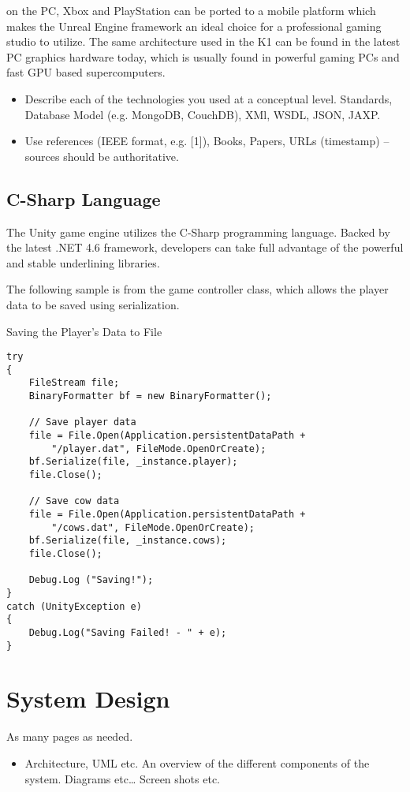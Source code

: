 on the PC, Xbox and PlayStation can be ported to a mobile platform which makes the Unreal Engine framework an ideal choice for a professional gaming studio to utilize. The same architecture used in the K1 can be found in the latest PC graphics hardware today, which is usually found in powerful gaming PCs and fast GPU based supercomputers. 

\begin{itemize}
\item Describe each of the technologies you used at a conceptual level. Standards, Database Model (e.g. MongoDB, CouchDB), XMl, WSDL, JSON, JAXP.
\item Use references (IEEE format, e.g. [1]), Books, Papers, URLs (timestamp) – sources should be authoritative. 
\end{itemize}

\section{C-Sharp Language}
The Unity game engine utilizes the C-Sharp programming language. Backed by the latest .NET 4.6 framework, developers can take full advantage of the powerful and stable underlining libraries. 

The following sample is from the game controller class, which allows the player data to be saved using serialization. 

Saving the Player's Data to File
\begin{verbatim}
try
{
	FileStream file;
	BinaryFormatter bf = new BinaryFormatter();
	
	// Save player data
	file = File.Open(Application.persistentDataPath + 
		"/player.dat", FileMode.OpenOrCreate);
	bf.Serialize(file, _instance.player);
	file.Close();
	
	// Save cow data
	file = File.Open(Application.persistentDataPath + 
		"/cows.dat", FileMode.OpenOrCreate);
	bf.Serialize(file, _instance.cows);
	file.Close();
	
	Debug.Log ("Saving!");
}
catch (UnityException e)
{
	Debug.Log("Saving Failed! - " + e);
}
\end{verbatim}

\chapter{System Design}
As many pages as needed.
\begin{itemize}
\item Architecture, UML etc. An overview of the different components of the system. Diagrams etc… Screen shots etc.
\end{itemize}

